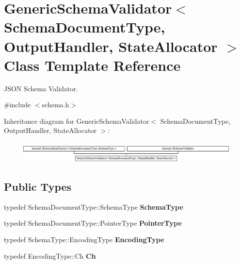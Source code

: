 \hypertarget{classGenericSchemaValidator}{}\section{Generic\+Schema\+Validator$<$ Schema\+Document\+Type, Output\+Handler, State\+Allocator $>$ Class Template Reference}
\label{classGenericSchemaValidator}


J\+S\+ON Schema Validator.  




{\ttfamily \#include $<$schema.\+h$>$}

Inheritance diagram for Generic\+Schema\+Validator$<$ Schema\+Document\+Type, Output\+Handler, State\+Allocator $>$\+:\begin{figure}[H]
\begin{center}
\leavevmode
\includegraphics[height=1.135903cm]{classGenericSchemaValidator}
\end{center}
\end{figure}
\subsection*{Public Types}
\begin{DoxyCompactItemize}
\item 
typedef Schema\+Document\+Type\+::\+Schema\+Type {\bfseries Schema\+Type}\hypertarget{classGenericSchemaValidator_ac79628f00f6720bbabb70b44f0d076a0}{}\label{classGenericSchemaValidator_ac79628f00f6720bbabb70b44f0d076a0}

\item 
typedef Schema\+Document\+Type\+::\+Pointer\+Type {\bfseries Pointer\+Type}\hypertarget{classGenericSchemaValidator_ae0c6c9a9c0ff6bae80e75c6705f2668b}{}\label{classGenericSchemaValidator_ae0c6c9a9c0ff6bae80e75c6705f2668b}

\item 
typedef Schema\+Type\+::\+Encoding\+Type {\bfseries Encoding\+Type}\hypertarget{classGenericSchemaValidator_acf1c5361bb96da87d23167d8720b1ea5}{}\label{classGenericSchemaValidator_acf1c5361bb96da87d23167d8720b1ea5}

\item 
typedef Encoding\+Type\+::\+Ch {\bfseries Ch}\hypertarget{classGenericSchemaValidator_a8b7dab5a0cda9cc0adaefb4401d260c1}{}\label{classGenericSchemaValidator_a8b7dab5a0cda9cc0adaefb4401d260c1}

\end{DoxyCompactItemize}
